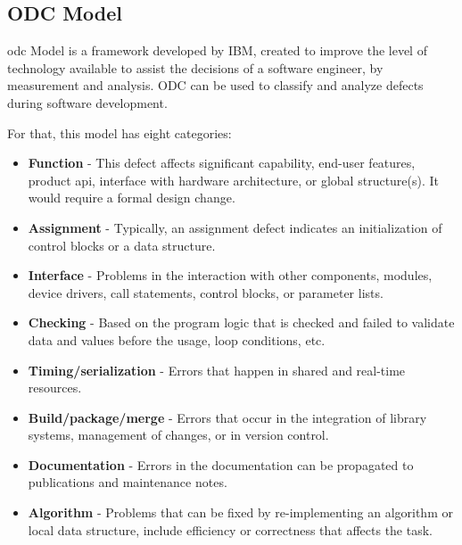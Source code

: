 
\clearpage
\subsection{ODC Model}
\acl{odc}\cite{bridge1998orthogonal} Model is a framework developed by IBM\cite{chillarege2004orthogonal}, created to improve the level of technology available to assist the decisions of a software engineer, by measurement and analysis.
ODC can be used to classify and analyze defects during software development.

For that, this model has eight categories:

\begin{itemize}
	\item \textbf{Function} - This defect affects significant capability, end-user features, product \acl{api}, interface with hardware architecture, or global structure(s). It would require a formal design change.
	\item \textbf{Assignment} - Typically, an assignment defect indicates an initialization of control blocks or a data structure.
	\item \textbf{Interface} - Problems in the interaction with other components, modules, device drivers, call statements, control blocks, or parameter lists.
	\item \textbf{Checking} - Based on the program logic that is checked and failed to validate data and values before the usage, loop conditions, etc.
	\item \textbf{Timing/serialization} - Errors that happen in shared and real-time resources.
	\item \textbf{Build/package/merge} - Errors that occur in the integration of library systems, management of changes, or in version control.
	\item \textbf{Documentation} - Errors in the documentation can be propagated to publications and maintenance notes.
	\item \textbf{Algorithm} - Problems that can be fixed by re-implementing an algorithm or local data structure, include efficiency or correctness that affects the task.
\end{itemize}


